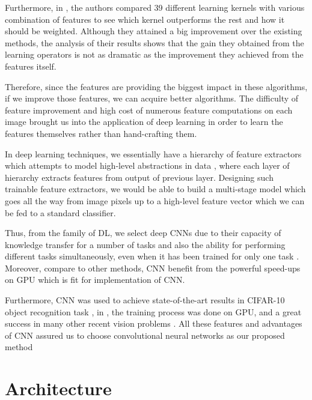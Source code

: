 Furthermore, in \cite{gehler2009feature}, the authors compared 39 different learning kernels with various combination of features to see which kernel outperforms the rest and how it should be weighted. Although they attained a big improvement over the existing methods, the analysis of their results shows that the gain they obtained from the learning operators is not as dramatic as the improvement they achieved from the features itself. 

\indent Therefore, since the features are providing the biggest impact in these algorithms, if we improve those features, we can acquire better algorithms. The difficulty of feature improvement and high cost of numerous feature computations on each image brought us into the application of deep learning in order to learn the features themselves rather than hand-crafting them. 

In deep learning techniques, we essentially have a hierarchy of feature extractors which attempts to model high-level abstractions in data \cite{deng2014deep, bengio2009learning, bengio2013representation, arel2010deep, schmidhuber2015deep}, where each layer of hierarchy extracts features from output of previous layer. Designing such trainable feature extractors, we would be able to build a multi-stage model which goes all the way from image pixels up to a high-level feature vector which we can be fed to a standard classifier. 

Thus, from the family of DL, we select deep CNNs due to their capacity of knowledge transfer for a number of tasks and also the ability for performing different tasks simultaneously, even when it has been trained for only one task \cite{zhou2014learning}. Moreover, compare to other methods, CNN benefit from the powerful speed-ups on GPU which is fit for implementation of CNN. 

Furthermore, CNN was used to achieve state-of-the-art results in CIFAR-10 object recognition task \cite{cirecsan2012multi}, in \cite{russakovsky2015imagenet}, the training process was done on GPU, and a great success in many other recent vision problems \cite{cirecsan2011convolutional, ciresan2015multi, wan2013regularization}. All these features and advantages of CNN assured us to choose convolutional neural networks as our proposed method

\section{Architecture}

